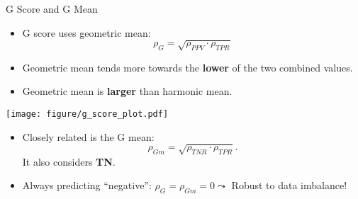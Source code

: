 \documentclass[11pt,compress,t,notes=noshow, xcolor=table]{beamer}
\begin{document}
\begin{vbframe}{G Score and G Mean}
	\footnotesize{
    	\begin{minipage}[c]{0.49\textwidth}
        	\begin{itemize}
        		\item G score uses geometric mean: 
        		$$\rho_{G} = \sqrt{\rho_{PPV} \cdot \rho_{TPR}}$$

        		\item Geometric mean tends more towards the \textbf{lower} of the two combined values.
                \item Geometric mean is \textbf{larger} than harmonic mean.
        	\end{itemize}
        \end{minipage}
        \begin{minipage}[c]{0.49\textwidth}
        	\centering
        	\texttt{[image: figure/g\_score\_plot.pdf]}
        \end{minipage}

        \begin{itemize}
        	\item Closely related is the G mean:
        	$$\rho_{Gm} = \sqrt{\rho_{TNR} \cdot \rho_{TPR}}.$$
        	It also considers \textbf{TN}.
    
        	\item Always predicting \enquote{negative}: $\rho_{G} = \rho_{Gm}  = 0 \leadsto$ Robust to data imbalance!
        \end{itemize}
}
\end{vbframe}
\end{document}
